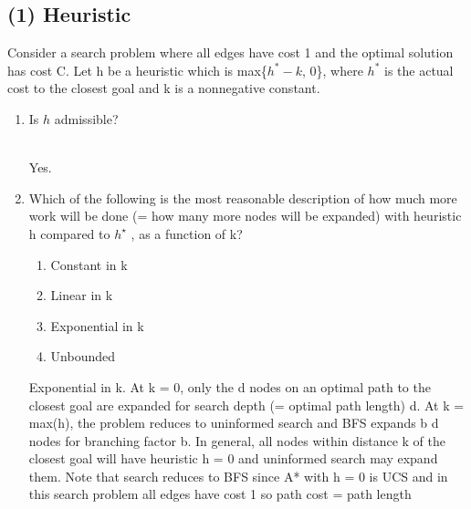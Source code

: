 \documentclass[9pt,a4paper]{extarticle}
\newenvironment{solution}
    {%
    \color{red}
    }
    { 
    \color{black}
    }
\begin{document}
\subsection*{(1) Heuristic}
Consider a search problem where all edges have cost 1 and the optimal solution has cost C. Let h be a heuristic which is max\{$h^* - k$, 0\}, where $h^*$ is the actual cost to the closest goal and k is a nonnegative constant.
\begin{enumerate}
    \item Is $h$ admissible?
    \begin{solution}
    \\
    Yes.
    \end{solution}
    \item Which of the following is the most reasonable description of how much more work will be done (= how many more nodes will be expanded) with heuristic h compared to $h^\star$ , as a function of k?
    \begin{enumerate}
        \item Constant in k
        \item Linear in k
        \item Exponential in k
        \item Unbounded
    \end{enumerate}
    \begin{solution}
    Exponential in k. At k = 0, only the d nodes on an optimal path to the closest goal are expanded for search depth (= optimal path length) d. At k = max(h), the problem reduces to uninformed search and BFS expands b d nodes for branching factor b. In general, all nodes within distance k of the closest goal will have heuristic h = 0 and uninformed search may expand them. Note that search reduces to BFS since A* with h = 0 is UCS and in this search problem all edges have cost 1 so path cost = path length
    \end{solution}
\end{enumerate}
\end{document}
